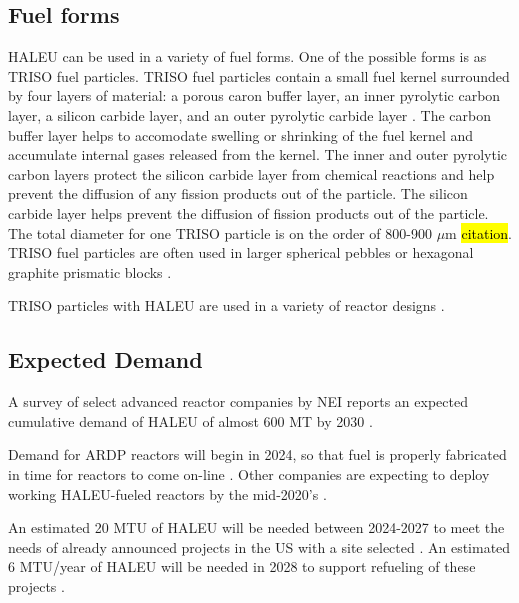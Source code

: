 \subsection{Fuel forms}
\gls{HALEU} can be used in a variety of fuel forms. One of the possible 
forms is as \gls{TRISO} fuel particles. \gls{TRISO} fuel particles contain 
a small fuel kernel surrounded by four layers of material: a porous caron 
buffer layer, an inner pyrolytic carbon layer, a silicon carbide layer, and 
an outer pyrolytic carbide layer \cite{powers_fully_2014}. The carbon buffer
layer helps to accomodate swelling or shrinking of the fuel kernel and 
accumulate internal gases released from the kernel. The inner and outer 
pyrolytic carbon layers protect the silicon carbide layer from chemical 
reactions and help prevent the diffusion of any fission products out of the 
particle. The silicon carbide layer helps prevent the diffusion of fission 
products out of the particle. The total diameter for one \gls{TRISO} 
particle is on the order of 800-900 $\mu$m \hl{citation}. \gls{TRISO} fuel 
particles are often used in 
larger spherical pebbles or hexagonal graphite prismatic blocks 
\cite{powers_fully_2014}.

\gls{TRISO} particles with \gls{HALEU} are used in a variety of reactor designs 
\cite{harlan_x-energy_2018,mitchell_usnc_2020,hussain_advances_2018}.

\subsection{Expected Demand}
A survey of select advanced reactor companies by \gls{NEI} reports an 
expected cumulative demand of \gls{HALEU} of almost 600 MT by 2030 
\cite{korsnick_need_2018}.

Demand for ARDP reactors will begin in 2024, so that fuel is 
properly fabricated in time for reactors to come on-line \cite{noauthor_establishing_2022}.
Other companies are expecting to deploy working \gls{HALEU}-fueled reactors 
by the mid-2020's \cite{noauthor_establishing_2022}.

An estimated 20 MTU of \gls{HALEU} will be needed between 2024-2027 to 
meet the needs of already announced projects in the US with a site 
selected \cite{noauthor_establishing_2022}. An estimated 6 MTU/year of 
\gls{HALEU} will be needed in 2028 to support refueling of these projects 
\cite{noauthor_establishing_2022}. 


